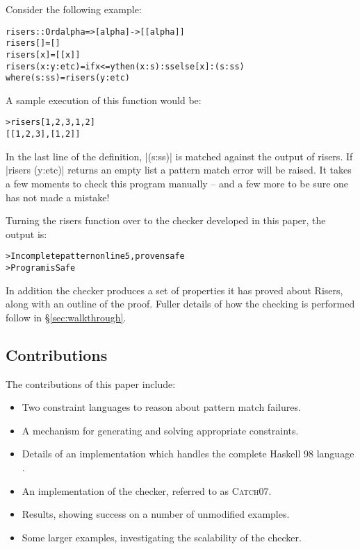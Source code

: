 \documentclass[preprint]{sigplanconf}
\newcommand{\C}[1]{\textsf{#1}}
\newcommand{\catch}{\textsc{Catch}}
\newenvironment{code}{\begin{alltt}\small}{\end{alltt}}
\begin{document}
Consider the following example:

\begin{code}
risers :: Ord alpha => [alpha] -> [[alpha]]
risers [] = []
risers [x] = [[x]]
risers (x:y:etc) = if x <= y then (x:s):ss else [x]:(s:ss)
    where (s:ss) = risers (y:etc)
\end{code}

A sample execution of this function would be:

\begin{code}
> risers [1,2,3,1,2]
[[1,2,3],[1,2]]
\end{code}

In the last line of the definition, |(s:ss)| is matched against the output of \C{risers}. If |risers (y:etc)| returns an empty list a pattern match error will be raised. It takes a few moments to check this program manually -- and a few more to be sure one has not made a mistake!

Turning the \C{risers} function over to the checker developed in this paper, the output is:

\begin{code}
> Incomplete pattern on line 5, proven safe
> Program is Safe
\end{code}

In addition the checker produces a set of properties it has proved about Risers, along with an outline of the proof. Fuller details of how the checking is performed follow in \S\ref{sec:walkthrough}.

\subsection{Contributions}

The contributions of this paper include:

\begin{itemize}
\item Two constraint languages to reason about pattern match failures.
\item A mechanism for generating and solving appropriate constraints.
\item Details of an implementation which handles the complete Haskell 98 language \citep{haskell}.
\item An implementation of the checker, referred to as \catch07.
\item Results, showing success on a number of unmodified examples.
\item Some larger examples, investigating the scalability of the checker.
\end{itemize}
\end{document}
